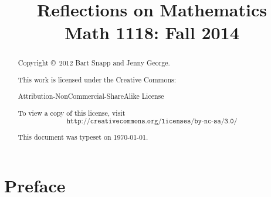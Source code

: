 

\title{
\textbf{\textsf{
\Huge Reflections on Mathematics \\
\Large Math 1118: Fall 2014
}}}
\author{}
\date{}
\maketitle



\begin{abstract}
Copyright \copyright~2012 Bart Snapp and Jenny George.

\vspace{.5cm}

\noindent
This work is licensed under the Creative Commons:
\begin{center}
Attribution-NonCommercial-ShareAlike License 
\end{center}
To view a copy of this license, visit
\[
\texttt{http://creativecommons.org/licenses/by-nc-sa/3.0/}
\]

\vspace{.5cm}

\noindent This document was typeset on \today.

\end{abstract}



\chapter*{Preface}


